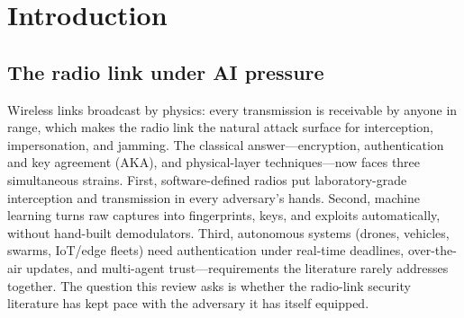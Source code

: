 \section{Introduction}
\label{sec:intro}
\subsection{The radio link under AI pressure}
Wireless links broadcast by physics: every transmission is receivable by anyone in range, which makes the radio link the natural attack surface for interception, impersonation, and jamming. The classical answer---encryption, authentication and key agreement (AKA), and physical-layer techniques---now faces three simultaneous strains. First, software-defined radios put laboratory-grade interception and transmission in every adversary's hands. Second, machine learning turns raw captures into fingerprints, keys, and exploits automatically, without hand-built demodulators. Third, autonomous systems (drones, vehicles, swarms, IoT/edge fleets) need authentication under real-time deadlines, over-the-air updates, and multi-agent trust---requirements the literature rarely addresses together. The question this review asks is whether the radio-link security literature has kept pace with the adversary it has itself equipped.


